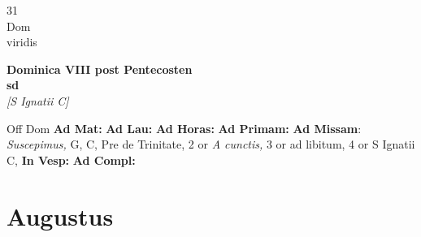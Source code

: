 \documentclass[10pt, openany]{book}
\begin{document}
    \begin{center}
        \begin{minipage}{3.5in}
            \vspace{2em}
            \begin{minipage}{0.5in}
                {\Huge 31} \\
                {\normalsize Dom} \\
                {\normalsize viridis}
            \end{minipage}
            \begin{minipage}{3.0in}
                \textbf{ \large Dominica VIII post Pentecosten \\
                \textnormal{\normalsize sd}} \\ \textit{[S Ignatii C]} \\ 
            \end{minipage}
            \begin{justify}Off Dom
                \textbf{Ad Mat: }
                \textbf{Ad Lau: }
                \textbf{Ad Horas: }
                \textbf{Ad Primam: }\textbf{Ad Missam}: \textit{Suscepimus,} G, C, Pre de Trinitate, 2 or \textit{A cunctis,} 3 or ad libitum, 4 or S Ignatii C,  
                \textbf{In Vesp: }
                \textbf{Ad Compl: }
            \end{justify}
        \end{minipage}
    \end{center}

    \chapter{Augustus}
                    
\end{document}
